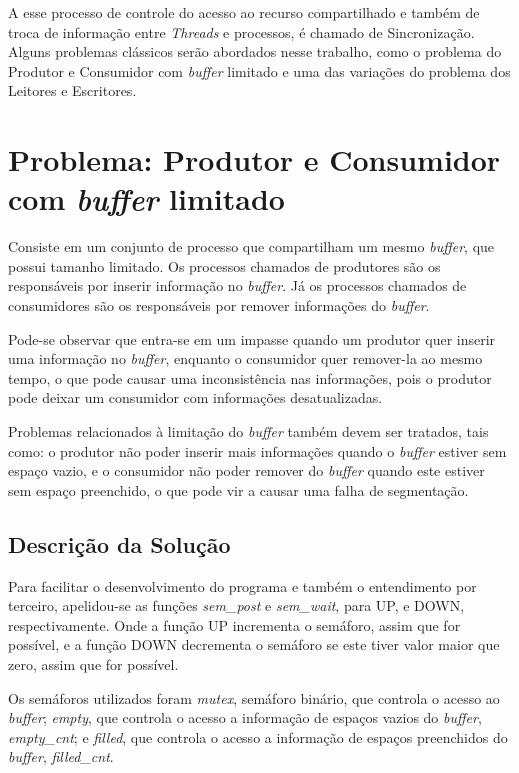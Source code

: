 \documentclass[a4paper, 11pt]{article}
\begin{document}
A esse processo de controle do acesso ao recurso compartilhado e também de troca de informação entre \textit{Threads} e processos, é chamado de Sincronização. Alguns problemas clássicos serão abordados nesse trabalho, como o problema do Produtor e Consumidor com \textit{buffer} limitado e uma das variações do problema dos Leitores e Escritores.

\section{Problema: Produtor e Consumidor com \textit{buffer} limitado}
Consiste em um conjunto de processo que compartilham um mesmo \textit{buffer}, que possui tamanho limitado. Os processos chamados de produtores são os responsáveis por inserir informação no \textit{buffer}. Já os processos chamados de consumidores são os responsáveis por remover informações do \textit{buffer}. 

Pode-se observar que entra-se em um impasse quando um produtor quer inserir uma informação no \textit{buffer}, enquanto o consumidor quer remover-la ao mesmo tempo, o que pode causar uma inconsistência nas informações, pois o produtor pode deixar um consumidor com informações desatualizadas.

Problemas relacionados à limitação do \textit{buffer} também devem ser tratados, tais como: o produtor não poder inserir mais informações quando o \textit{buffer} estiver sem espaço vazio, e o consumidor não poder remover do \textit{buffer} quando este estiver sem espaço preenchido, o que pode vir a causar uma falha de segmentação.

\subsection{Descrição da Solução}
Para facilitar o desenvolvimento do programa e também o entendimento por terceiro, apelidou-se as funções \textit{sem\_post} e \textit{sem\_wait}, para UP, e DOWN, respectivamente. Onde a função UP incrementa o semáforo, assim que for possível, e a função DOWN decrementa o semáforo se este tiver valor maior que zero, assim que for possível.

Os semáforos utilizados foram \textit{mutex}, semáforo binário, que controla o acesso ao \textit{buffer}; \textit{empty}, que controla o acesso a informação de espaços vazios do \textit{buffer}, \textit{empty\_cnt}; e \textit{filled}, que controla o acesso a informação de espaços preenchidos do \textit{buffer}, \textit{filled\_cnt}.
\end{document}
